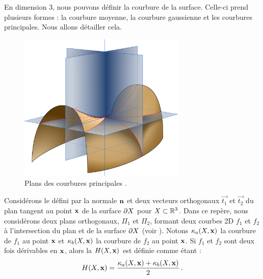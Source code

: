 %     


En dimension 3, nous pouvons définir la courbure de la surface. Celle-ci prend
plusieurs formes : la courbure moyenne, la courbure gaussienne et les courbures
principales. Nous allons détailler cela. %

\begin{figure}[ht]{
    \begin{center}
    \includegraphics[width=8cm]{figures/Minimal_surface_curvature_planes-fr}
    \end{center}}
    \caption{Plans des courbures principales \cite{WikipediaCurv}.\label{fig:wiki-surv}}
\end{figure}

Considérons le  défini par la normale $\mathbf{n}$ et
deux vecteurs orthogonaux $\vec{t_1}$ et $\vec{t_2}$ du plan tangent au point
$\mathbf{x}$ de la surface $\partial X$ pour $X \subset \mathbb{R}^3$. Dans ce repère, nous
considérons deux plans orthogonaux, $\Pi_1$ et $\Pi_2$, formant deux courbes 2D
$f_1$ et $f_2$ à l'intersection du plan et de la surface $\partial X$ (voir
). Notons $\kappa_{a}(X,\mathbf{x})$ la courbure de $f_1$ au
point $\mathbf{x}$ et $\kappa_{b}(X,\mathbf{x})$ la courbure de $f_2$ au point $\mathbf{x}$. Si
$f_1$ et $f_2$ sont deux fois dérivables en $\mathbf{x}$, alors la  $H(X,\mathbf{x})$ est définie comme étant :
%
\begin{equation}
  H(X,\mathbf{x}) = \frac{\kappa_{a}(X,\mathbf{x}) + \kappa_{b}(X,\mathbf{x})}{2} \,.
\end{equation}

